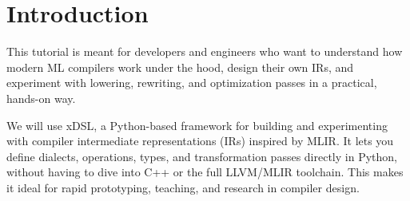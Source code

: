 \documentclass[../main.tex]{subfiles}
\begin{document}
\section{Introduction}

This tutorial is meant for developers and engineers who want to understand how modern ML compilers work
under the hood, design their own IRs, and experiment with lowering, rewriting, and optimization 
passes in a practical, hands-on way.

We will use xDSL, a Python-based framework for building and experimenting with compiler intermediate
representations (IRs) inspired by MLIR. It lets you define dialects, operations, types, and
transformation passes directly in Python, without having to dive into C++ or the full LLVM/MLIR
toolchain. This makes it ideal for rapid prototyping, teaching, and research in compiler design.
\end{document}
